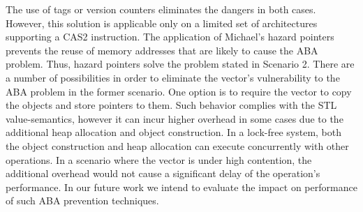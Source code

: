 The use of tags or version counters eliminates the dangers in both
cases. However, this solution is applicable only on a limited set of
architectures supporting a CAS2 instruction. The application of
Michael's hazard pointers prevents the reuse of memory addresses that
are likely to cause the ABA problem. Thus, hazard pointers solve the
problem stated in Scenario 2. There are a number of possibilities in
order to eliminate the vector's vulnerability to the ABA problem in
the former scenario. One option is to require the vector to copy the
objects and store pointers to them. Such behavior complies with the
STL value-semantics, however it can incur higher overhead in some
cases due to the additional heap allocation and object
construction. In a lock-free system, both the object construction and
heap allocation can execute concurrently with other operations. In a
scenario where the vector is under high contention, the additional
overhead would not cause a significant delay of the operation's
performance. In our future work we intend to evaluate the impact on
performance of such ABA prevention techniques.


